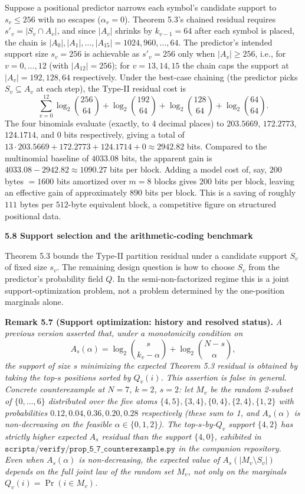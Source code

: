 \documentclass[
]{article}
\begin{document}
Suppose a positional predictor narrows each symbol's candidate
support to $s_v \leq 256$ with no escapes ($\alpha_v = 0$).
Theorem 5.3's chained residual requires
$s'_v = |S_v \cap A_v|$, and since $|A_v|$ shrinks by $k_{v-1} = 64$
after each symbol is placed, the chain is
$|A_0|, |A_1|, \dots, |A_{15}| = 1024, 960, \dots, 64$. The
predictor's intended support size $s_v = 256$ is achievable as
$s'_v = 256$ only when $|A_v| \geq 256$, i.e., for $v = 0, \dots,
12$ (with $|A_{12}| = 256$); for $v = 13, 14, 15$ the chain caps
the support at $|A_v| = 192, 128, 64$ respectively. Under the
best-case chaining (the predictor picks $S_v \subseteq A_v$ at each
step), the Type-II residual cost is
\[
\sum_{v=0}^{12} \log_2 \binom{256}{64}
+ \log_2 \binom{192}{64}
+ \log_2 \binom{128}{64}
+ \log_2 \binom{64}{64}.
\]
The four binomials evaluate (exactly, to 4 decimal places) to
$203.5669$, $172.2773$, $124.1714$, and $0$ bits respectively,
giving a total of
$13 \cdot 203.5669 + 172.2773 + 124.1714 + 0 \approx 2942.82$ bits.
Compared to the multinomial baseline of $4033.08$ bits, the
apparent gain is $4033.08 - 2942.82 \approx 1090.27$ bits per block.
Adding a model cost of, say, $200$ bytes $= 1600$ bits amortized
over $m = 8$ blocks gives $200$ bits per block, leaving an
effective gain of approximately $890$ bits per block. This is a
saving of roughly $111$ bytes per $512$-byte equivalent block, a
competitive figure on structured positional data.

\textbf{5.8 Support selection and the arithmetic-coding benchmark}

Theorem 5.3 bounds the Type-II partition residual under a candidate
support $S_v$ of fixed size $s_v$. The remaining design question is
how to choose $S_v$ from the predictor's probability field $Q$. In the
semi-non-factorized regime this is a joint support-optimization
problem, not a problem determined by the one-position marginals alone.

\textbf{Remark 5.7 (Support optimization: history and resolved status).}
\emph{A previous version asserted that, under a monotonicity condition
on
\[
A_s(\alpha)
= \log_2 \binom{s}{k_v - \alpha}
+ \log_2 \binom{N - s}{\alpha},
\]
the support of size $s$ minimizing the expected Theorem 5.3 residual
is obtained by taking the top-$s$ positions sorted by $Q_v(i)$. This
assertion is false in general. Concrete counterexample at $N = 7$,
$k = 2$, $s = 2$: let $M_v$ be the random 2-subset of $\{0, \dots, 6\}$
distributed over the five atoms
$\{4,5\}, \{3,4\}, \{0,4\}, \{2,4\}, \{1,2\}$ with probabilities
$0.12, 0.04, 0.36, 0.20, 0.28$ respectively (these sum to 1, and
$A_s(\alpha)$ is non-decreasing on the feasible $\alpha \in \{0,1,2\}$).
The top-$s$-by-$Q_v$ support $\{4, 2\}$ has strictly higher expected
$A_s$ residual than the support $\{4, 0\}$, exhibited in
$\texttt{scripts/verify/prop\_5\_7\_counterexample.py}$ in the
companion repository. Even when $A_s(\alpha)$ is non-decreasing, the
expected value of $A_s(|M_v \setminus S_v|)$ depends on the full
joint law of the random set $M_v$, not only on the marginals
$Q_v(i) = \Pr(i \in M_v)$.}
\end{document}
